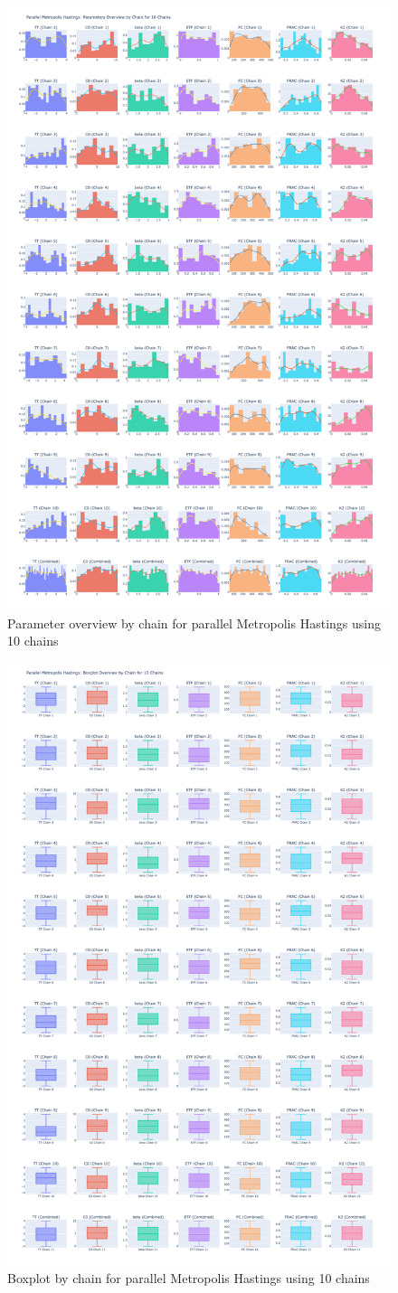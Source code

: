 \begin{figure}[H]
    \centering
    \includegraphics[width=.6\textwidth]{figures/parallel_mh/param_overview_10.png}
    \captionsetup{width=.8\textwidth}
    \caption{Parameter overview by chain for parallel Metropolis Hastings using 10 chains}
    \label{fig:enter-label}
\end{figure}

\begin{figure}[H]
    \centering
    \includegraphics[width=.6\textwidth]{figures/parallel_mh/boxplot_10.png}
    \captionsetup{width=.8\textwidth}
    \caption{Boxplot by chain for parallel Metropolis Hastings using 10 chains}
    \label{fig:enter-label}
\end{figure}

